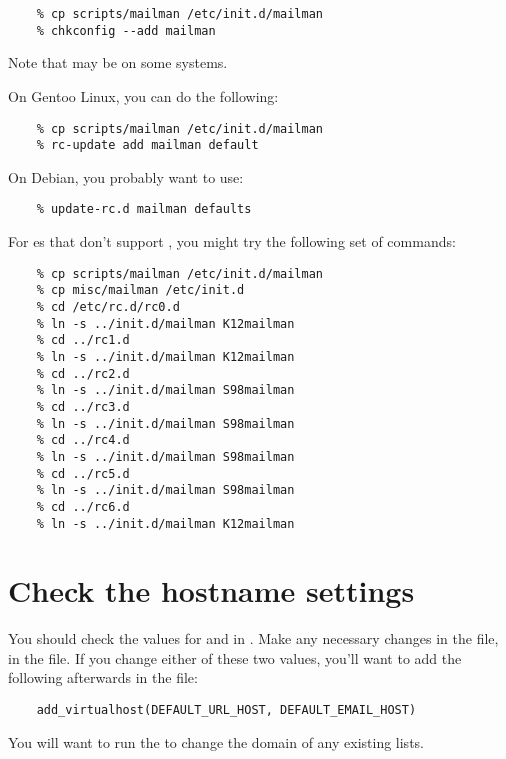 \documentclass{howto}
\begin{document}
\begin{verbatim}
    % cp scripts/mailman /etc/init.d/mailman
    % chkconfig --add mailman
\end{verbatim}

Note that  may be  on some systems.

On Gentoo Linux, you can do the following:

\begin{verbatim}
    % cp scripts/mailman /etc/init.d/mailman
    % rc-update add mailman default
\end{verbatim}

On Debian, you probably want to use:

\begin{verbatim}
    % update-rc.d mailman defaults
\end{verbatim}

For \UNIX{}es that don't support , you might try the
following set of commands:

\begin{verbatim}
    % cp scripts/mailman /etc/init.d/mailman
    % cp misc/mailman /etc/init.d
    % cd /etc/rc.d/rc0.d
    % ln -s ../init.d/mailman K12mailman
    % cd ../rc1.d
    % ln -s ../init.d/mailman K12mailman
    % cd ../rc2.d
    % ln -s ../init.d/mailman S98mailman
    % cd ../rc3.d
    % ln -s ../init.d/mailman S98mailman
    % cd ../rc4.d
    % ln -s ../init.d/mailman S98mailman
    % cd ../rc5.d
    % ln -s ../init.d/mailman S98mailman
    % cd ../rc6.d
    % ln -s ../init.d/mailman K12mailman
\end{verbatim}

\section{Check the hostname settings}

You should check the values for  and
 in .  Make any necessary changes in
the  file,  in the  file.  If you
change either of these two values, you'll want to add the following afterwards
in the  file:

\begin{verbatim}
    add_virtualhost(DEFAULT_URL_HOST, DEFAULT_EMAIL_HOST)
\end{verbatim}

You will want to run the  to change the domain of any
existing lists.
\end{document}
